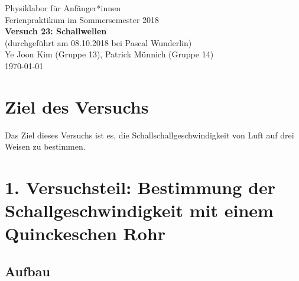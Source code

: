 \documentclass[11pt,a4paper]{article}
\begin{document}
{
\centering 
\large 
Physiklabor für Anf\"anger*innen \\
Ferienpraktikum im Sommersemester 2018 \\[4mm]
\textbf{\LARGE 
Versuch 23: Schallwellen
} \\[3mm]
(durchgef\"uhrt am 08.10.2018 bei Pascal Wunderlin) \\
Ye Joon Kim (Gruppe 13), Patrick M\"unnich (Gruppe 14)\\
\today \\[10mm]
}

\vspace{50pt}
\tableofcontents
\vspace{22pt}
\listoftables
\vspace{22pt}
\listoffigures
\pagebreak

\section{Ziel des Versuchs}
Das Ziel dieses Versuchs ist es, die Schallschallgeschwindigkeit von Luft auf drei Weisen zu bestimmen. 

\section{1. Versuchsteil: Bestimmung der Schallgeschwindigkeit mit einem Quinckeschen Rohr}


\subsection{Aufbau}
\end{document}
